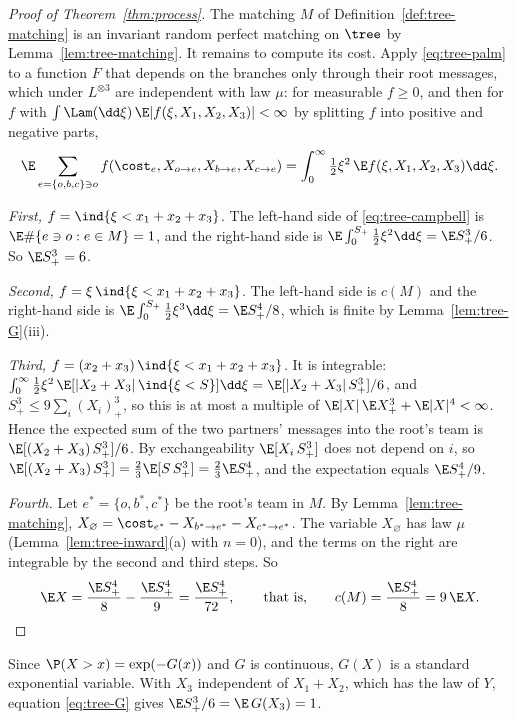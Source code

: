 \begin{proof}[Proof of Theorem~\ref{thm:process}]
The matching $M$ of Definition~\ref{def:tree-matching} is an invariant random perfect matching
on $\tree$ by Lemma~\ref{lem:tree-matching}. It remains to compute its cost. Apply
\eqref{eq:tree-palm} to a function $F$ that depends on the branches only through their root
messages, which under $L^{\otimes3}$ are independent with law $\mu$: for measurable
$f\ge0$, and then for $f$ with $\int\Lam(\dd\xi)\,\E|f(\xi,X_1,X_2,X_3)|<\infty$ by
splitting $f$ into positive and negative parts,
\begin{equation}\label{eq:tree-campbell}
  \E\sum_{e=\{o,b,c\}\ni o}f(\cost_e,X_{o\to e},X_{b\to e},X_{c\to e})
  =\int_0^\infty\tfrac12\xi^2\,\E f(\xi,X_1,X_2,X_3)\dd\xi .
\end{equation}

\emph{First,} $f=\ind\{\xi<x_1+x_2+x_3\}$. The left-hand side of \eqref{eq:tree-campbell} is
$\E\#\{e\ni o:e\in M\}=1$, and the right-hand side is
$\E\int_0^{S_+}\tfrac12\xi^2\dd\xi=\E S_+^3/6$. So $\E S_+^3=6$.

\emph{Second,} $f=\xi\,\ind\{\xi<x_1+x_2+x_3\}$. The left-hand side is $c(M)$ and the right-hand
side is $\E\int_0^{S_+}\tfrac12\xi^3\dd\xi=\E S_+^4/8$, which is finite by
Lemma~\ref{lem:tree-G}(iii).

\emph{Third,} $f=(x_2+x_3)\,\ind\{\xi<x_1+x_2+x_3\}$. It is integrable:
$\int_0^\infty\tfrac12\xi^2\,\E[|X_2+X_3|\,\ind\{\xi<S\}]\dd\xi=\E[|X_2+X_3|\,S_+^3]/6$, and
$S_+^3\le9\sum_i(X_i)_+^3$, so this is at most a multiple of
$\E|X|\,\E X_+^3+\E|X|^4<\infty$. Hence the expected sum of the two partners' messages into the
root's team is $\E[(X_2+X_3)\,S_+^3]/6$. By exchangeability $\E[X_i\,S_+^3]$ does not depend on
$i$, so $\E[(X_2+X_3)\,S_+^3]=\tfrac23\E[S\,S_+^3]=\tfrac23\E S_+^4$, and the expectation equals
$\E S_+^4/9$.

\emph{Fourth.} Let $e^*=\{o,b^*,c^*\}$ be the root's team in $M$. By
Lemma~\ref{lem:tree-matching},
$X_\varnothing=\cost_{e^*}-X_{b^*\to e^*}-X_{c^*\to e^*}$. The variable $X_\varnothing$ has law
$\mu$ (Lemma~\ref{lem:tree-inward}(a) with $n=0$), and the terms on the right are integrable by
the second and third steps. So
\[
  \E X=\frac{\E S_+^4}{8}-\frac{\E S_+^4}{9}=\frac{\E S_+^4}{72},
  \qquad\text{that is,}\qquad c(M)=\frac{\E S_+^4}{8}=9\,\E X .\qedhere
\]
\end{proof}

\begin{remark}[a check of $\E S_+^3=6$ without the tree]\label{rem:tree-check}
Since $\P(X>x)=\exp(-G(x))$ and $G$ is continuous, $G(X)$ is a standard exponential variable.
With $X_3$ independent of $X_1+X_2$, which has the law of $Y$, equation \eqref{eq:tree-G}
gives $\E S_+^3/6=\E\,G(X_3)=1$.
\end{remark}

